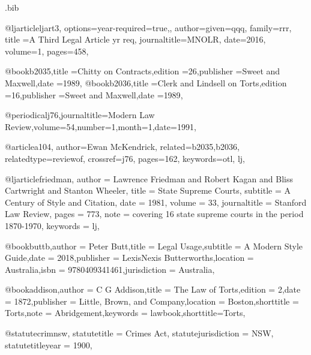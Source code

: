 \begin{filecontents*}[overwrite]{\jobname.bib}


@ljarticle{ljart3,
options={year-required=true,},
author={given=qqq, family=rrr},
title ={A Third Legal Article yr req},
journaltitle={MNOLR},
date={2016},
volume={1},
pages={458},
}

@book{b2035,title ={Chitty on Contracts},edition ={26},publisher ={Sweet and Maxwell},date ={1989},}
@book{b2036,title ={Clerk and Lindsell on Torts},edition ={16},publisher ={Sweet and Maxwell},date ={1989},}

@periodical{j76,journaltitle={Modern Law Review},volume={54},number={1},month={1},date={1991},}

@article{a104,
author={Ewan McKendrick},
related={b2035,b2036},
relatedtype={reviewof},
crossref={j76},
pages={162},
keywords={otl, lj},
}




@ljarticle{friedman,
author = {Lawrence Friedman and Robert Kagan and Bliss Cartwright and Stanton Wheeler},
title = {State Supreme Courts},
subtitle = {A Century of Style and Citation},
date = {1981},
volume = {33},
journaltitle = {Stanford Law Review},
pages = {773},
note = {covering 16 state supreme courts in the period 1870-1970},
keywords = {lj},
}




@book{buttb,author = {Peter Butt},title = {Legal Usage},subtitle = {A Modern Style Guide},date = {2018},publisher = {LexisNexis Butterworths},location = {Australia},isbn = {9780409341461},jurisdiction = {Australia},}

@book{addison,author = {C G Addison},title = {The Law of Torts},edition = {2},date = {1872},publisher = {Little, Brown, and Company},location = {Boston},shorttitle = {Torts},note = {Abridgement},keywords = {lawbook},shorttitle={Torts},}


@statute{crimnsw,
statutetitle = {Crimes Act},
statutejurisdiction = {NSW},
statutetitleyear = {1900},%
}


\end{filecontents*}
